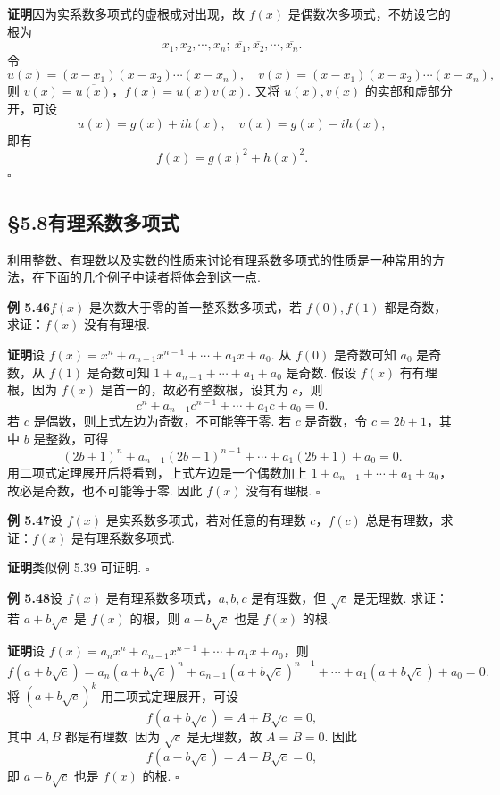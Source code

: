 \documentclass[UTF8,12pt,a4paper,fontset=fandol]{ctexart}
\begin{document}
\noindent\textbf{证明}\quad 因为实系数多项式的虚根成对出现，故 $f(x)$ 是偶数次多项式，不妨设它的根为
\[
x_1,x_2,\cdots,x_n;\ \overline{x_1},\overline{x_2},\cdots,\overline{x_n}.
\]
令
\[
u(x)=(x-x_1)(x-x_2)\cdots(x-x_n),\quad
v(x)=(x-\overline{x_1})(x-\overline{x_2})\cdots(x-\overline{x_n}),
\]
则 $v(x)=\overline{u(x)}$，$f(x)=u(x)v(x)$. 又将 $u(x),v(x)$ 的实部和虚部分开，可设
\[
u(x)=g(x)+ih(x),\quad v(x)=g(x)-ih(x),
\]
即有
\[
f(x)=g(x)^2+h(x)^2.
\]
\hfill $\square$

\subsection*{§5.8\quad 有理系数多项式}

利用整数、有理数以及实数的性质来讨论有理系数多项式的性质是一种常用的方法，在下面的几个例子中读者将体会到这一点.

\noindent\textbf{例 5.46}\quad $f(x)$ 是次数大于零的首一整系数多项式，若 $f(0),f(1)$ 都是奇数，求证：$f(x)$ 没有有理根.

\noindent\textbf{证明}\quad 设 $f(x)=x^n+a_{n-1}x^{n-1}+\cdots+a_1x+a_0$. 从 $f(0)$ 是奇数可知 $a_0$ 是奇数，从 $f(1)$ 是奇数可知 $1+a_{n-1}+\cdots+a_1+a_0$ 是奇数. 假设 $f(x)$ 有有理根，因为 $f(x)$ 是首一的，故必有整数根，设其为 $c$，则
\[
c^n+a_{n-1}c^{n-1}+\cdots+a_1c+a_0=0.
\]
若 $c$ 是偶数，则上式左边为奇数，不可能等于零. 若 $c$ 是奇数，令 $c=2b+1$，其中 $b$ 是整数，可得
\[
(2b+1)^n+a_{n-1}(2b+1)^{n-1}+\cdots+a_1(2b+1)+a_0=0.
\]
用二项式定理展开后将看到，上式左边是一个偶数加上 $1+a_{n-1}+\cdots+a_1+a_0$，故必是奇数，也不可能等于零. 因此 $f(x)$ 没有有理根. \hfill $\square$

\noindent\textbf{例 5.47}\quad 设 $f(x)$ 是实系数多项式，若对任意的有理数 $c$，$f(c)$ 总是有理数，求证：$f(x)$ 是有理系数多项式.

\noindent\textbf{证明}\quad 类似例 5.39 可证明. \hfill $\square$

\noindent\textbf{例 5.48}\quad 设 $f(x)$ 是有理系数多项式，$a,b,c$ 是有理数，但 $\sqrt c$ 是无理数. 求证：若 $a+b\sqrt c$ 是 $f(x)$ 的根，则 $a-b\sqrt c$ 也是 $f(x)$ 的根.

\noindent\textbf{证明}\quad 设 $f(x)=a_nx^n+a_{n-1}x^{n-1}+\cdots+a_1x+a_0$，则
\[
f(a+b\sqrt c)=a_n(a+b\sqrt c)^n+a_{n-1}(a+b\sqrt c)^{n-1}+\cdots+a_1(a+b\sqrt c)+a_0=0.
\]
将 $(a+b\sqrt c)^k$ 用二项式定理展开，可设
\[
f(a+b\sqrt c)=A+B\sqrt c=0,
\]
其中 $A,B$ 都是有理数. 因为 $\sqrt c$ 是无理数，故 $A=B=0$. 因此
\[
f(a-b\sqrt c)=A-B\sqrt c=0,
\]
即 $a-b\sqrt c$ 也是 $f(x)$ 的根. \hfill $\square$
\end{document}
